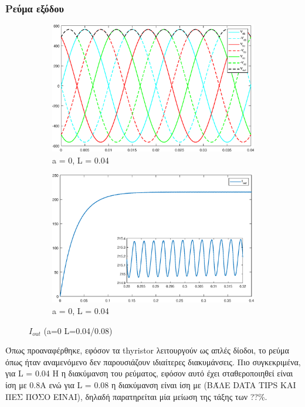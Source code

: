 \subsubsection{Ρεύμα εξόδου}

\begin{figure}[h]
	\centering
	\begin{subfigure}{.5\textwidth}
		\centering
		\includegraphics[width =1\textwidth]{Images/3_Iout_0_04}
		\caption{a = 0, L = 0.04}
		\label{fig:3_iout_0_04}
	\end{subfigure}%
	\begin{subfigure}{.5\textwidth}
		\centering
		\includegraphics[width = 1\textwidth]{Images/3_Iout_0_08}
		\caption{a = 0, L = 0.04}
		\label{fig:3_iout_0_08}
	\end{subfigure}
	\caption{$I_{out} $ (a=0 L=0.04/0.08)}
	\label{figs:3_iout_0}
\end{figure}


Όπως προαναφέρθηκε, εφόσον τα thyristor λειτουργούν ως απλές δίοδοι, το ρεύμα όπως ήταν αναμενόμενο δεν παρουσιάζουν ιδιαίτερες διακυμάνσεις. Πιο συγκεκριμένα, για L = 0.04 H η διακύμανση του ρεύματος, εφόσον αυτό έχει σταθεροποιηθεί είναι ίση με 0.8Α ενώ για L = 0.08 η διακύμανση είναι ίση με (ΒΆΛΕ DATA TIPS ΚΑΙ ΠΕΣ ΠΌΣΟ ΕΊΝΑΙ), δηλαδή παρατηρείται μία μείωση της τάξης των ??\%.


